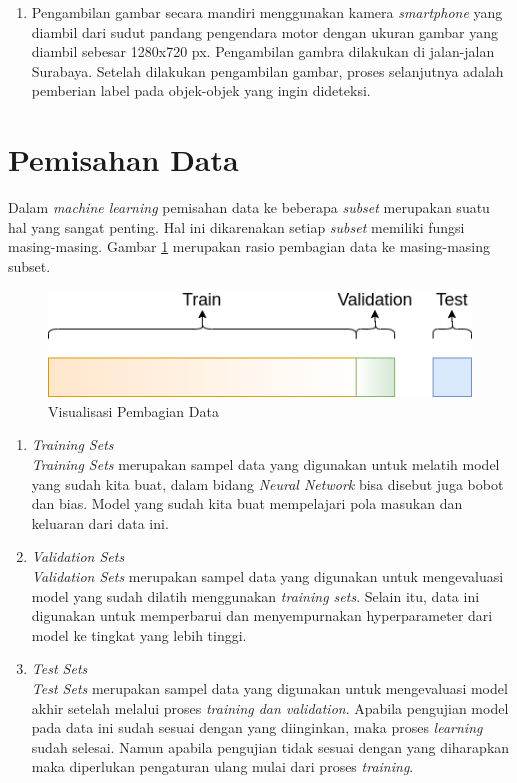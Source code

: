 \begin{enumerate}
		\item Pengambilan gambar secara mandiri menggunakan kamera \textit{smartphone} yang diambil dari sudut pandang pengendara motor dengan ukuran gambar yang diambil sebesar 1280x720 px. Pengambilan gambra dilakukan di jalan-jalan Surabaya. Setelah dilakukan pengambilan gambar, proses selanjutnya adalah pemberian label pada objek-objek yang ingin dideteksi.
	\end{enumerate}

\section{Pemisahan Data}
\label{sec:pemisahandata}

Dalam \textit{machine learning} pemisahan data ke beberapa \textit{subset} merupakan suatu hal yang sangat penting. Hal ini dikarenakan setiap \textit{subset} memiliki fungsi masing-masing. Gambar \ref{fig:data-splitting} merupakan rasio pembagian data ke masing-masing subset.

\begin{figure}[ht]
	\centering
	\includegraphics[scale=0.5]{gambar/data-splitting.png}
	\caption{Visualisasi Pembagian Data}
	\label{fig:data-splitting}
\end{figure}

\begin{enumerate}
	\item \textit{Training Sets}\\
	\textit{Training Sets} merupakan sampel data yang digunakan untuk melatih model yang sudah kita buat, dalam bidang \textit{Neural Network} bisa disebut juga bobot dan bias. Model yang sudah kita buat mempelajari pola masukan dan keluaran dari data ini. 
	
	\item \textit{Validation Sets}\\
	\textit{Validation Sets} merupakan sampel data yang digunakan untuk mengevaluasi model yang sudah dilatih menggunakan \textit{training sets}. Selain itu, data ini digunakan untuk memperbarui dan menyempurnakan hyperparameter dari model ke tingkat yang lebih tinggi.
	
	\item\textit{Test Sets}\\
	\textit{Test Sets} merupakan sampel data yang digunakan untuk mengevaluasi model akhir setelah melalui proses \textit{training dan validation}. Apabila pengujian model pada data ini sudah sesuai dengan yang diinginkan, maka proses \textit{learning} sudah selesai. Namun apabila pengujian tidak sesuai dengan yang diharapkan maka diperlukan pengaturan ulang mulai dari proses \textit{training}. 
\end{enumerate}

